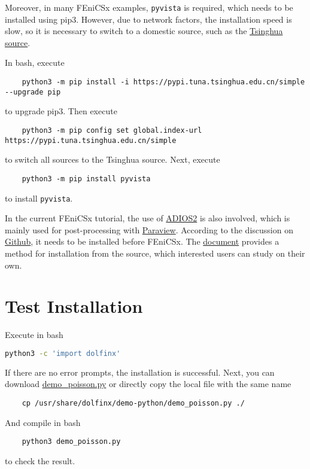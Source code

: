 \documentclass{report}
\begin{document}
Moreover, in many FEniCSx examples, \texttt{pyvista} is required, which needs to be installed using \textsf{pip3}. However, due to network factors, the installation speed is slow, so it is necessary to switch to a domestic source, such as the \href{https://mirrors.tuna.tsinghua.edu.cn/help/pypi/}{Tsinghua source}.

In \textsf{bash}, execute
\begin{lstlisting}
	python3 -m pip install -i https://pypi.tuna.tsinghua.edu.cn/simple --upgrade pip
\end{lstlisting}
to upgrade \textsf{pip3}. Then execute
\begin{lstlisting}
	python3 -m pip config set global.index-url https://pypi.tuna.tsinghua.edu.cn/simple
\end{lstlisting}
to switch all sources to the Tsinghua source. Next, execute
\begin{lstlisting}
	python3 -m pip install pyvista
\end{lstlisting}
to install \texttt{pyvista}.

In the current FEniCSx tutorial, the use of \href{https://github.com/ornladios/ADIOS2}{ADIOS2} is also involved, which is mainly used for post-processing with \href{https://www.paraview.org/}{Paraview}. According to the discussion on \href{https://github.com/jorgensd/dolfinx-tutorial/issues/125#issuecomment-1502776418}{Github}, it needs to be installed before FEniCSx. The \href{https://adios2.readthedocs.io/en/latest/setting_up/setting_up.html#}{document} provides a method for installation from the source, which interested users can study on their own.

\section{Test Installation}

Execute in \textsf{bash} 
\begin{lstlisting}[language = bash]
	python3 -c 'import dolfinx'
\end{lstlisting}
If there are no error prompts, the installation is successful. Next, you can download \href{https://docs.fenicsproject.org/dolfinx/main/python/_downloads/b94ac7be61dc3726ca331afd20f195d2/demo_poisson.py}{demo\_poisson.py} or directly copy the local file with the same name
\begin{lstlisting}
	cp /usr/share/dolfinx/demo-python/demo_poisson.py ./
\end{lstlisting}
And compile in \textsf{bash}
\begin{lstlisting}
	python3 demo_poisson.py
\end{lstlisting}
to check the result.
\end{document}
